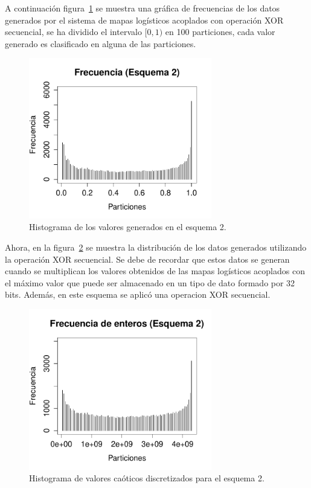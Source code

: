 \documentclass[preprint]{elsarticle}
\begin{document}
A continuación figura~\ref{f3} se muestra una gráfica de frecuencias de los datos generados por el sistema de mapas logísticos acoplados con operación XOR secuencial, se ha dividido el intervalo $[0,1)$ en 100 particiones, cada valor generado es clasificado en alguna de las particiones.


\begin{figure}[H]  
\centering
\includegraphics[width=8cm]{figure3.pdf}
\caption{Histograma de los valores generados en el esquema 2.}
\label{f3}
\end{figure}


Ahora, en la figura~\ref{f4} se muestra la distribución de los datos generados utilizando la operación  XOR secuencial. Se debe de recordar que estos datos se generan cuando se multiplican los valores obtenidos de las mapas logísticos acoplados con el máximo valor que puede ser almacenado en un tipo de dato formado por 32 bits. Además, en este esquema se aplicó una operacion XOR secuencial.


\begin{figure}[H]
\centering
\includegraphics[width=8cm]{figure4.pdf}
\caption{Histograma de valores caóticos discretizados para el esquema 2.}
\label{f4}
\end{figure}
\end{document}
